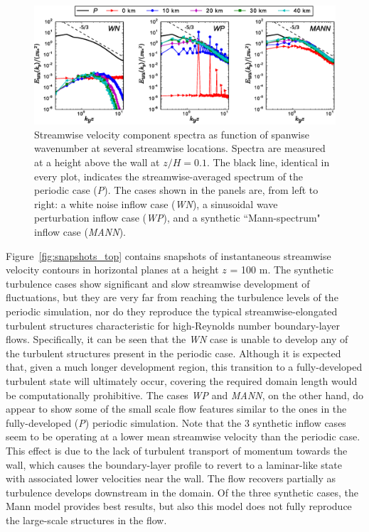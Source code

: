 	
	\begin{figure}[ht!]
		\centering
		\includegraphics[width=\textwidth]{chapters/turbulent_inflow/blm/figure2.eps}
		\caption{Streamwise velocity component spectra as function of spanwise wavenumber at several streamwise locations. Spectra are measured at a height above the wall at $z/H = 0.1$. The black line, identical in every plot, indicates the streamwise-averaged spectrum of the periodic case (\emph{P}). The cases shown in the panels are, from left to right: a white noise inflow case (\emph{WN}), a sinusoidal wave perturbation inflow case (\emph{WP}), and a synthetic ``Mann-spectrum" inflow case (\emph{MANN}).}
		\label{fig:spectra}
	\end{figure}
	
	
	Figure~\ref{fig:snapshots_top} contains snapshots of instantaneous streamwise velocity contours in horizontal planes at a height $z$ = 100 m.
	The synthetic turbulence cases show significant and slow streamwise development of fluctuations, but they are very far from reaching the turbulence levels of the periodic simulation, nor do they reproduce the typical streamwise-elongated turbulent structures characteristic for high-Reynolds number boundary-layer flows.
	Specifically, it can be seen that the \emph{WN} case is unable to develop any of the turbulent structures present in the periodic case.  Although it is expected that, given a much longer development region, this transition to a fully-developed turbulent state will ultimately occur, covering the required domain length would be computationally prohibitive. The cases \emph{WP} and \emph{MANN}, on the other hand, do appear to show some of the small scale flow features similar to the ones in the fully-developed (\emph{P}) periodic simulation.  Note that the 3 synthetic inflow cases seem to be operating at a lower mean streamwise velocity than the periodic case. This effect is due to the lack of turbulent transport of momentum towards the wall, which causes the boundary-layer profile to revert to a laminar-like state with associated lower velocities near the wall. The flow recovers partially as turbulence develops downstream in the domain.  Of the three synthetic cases, the Mann model provides best results, but also this model does not fully reproduce the large-scale structures in the flow.
	
